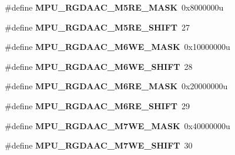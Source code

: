 \begin{DoxyCompactItemize}
\item 
\hypertarget{group___m_p_u___register___masks_ga96965e716b1fba479c7903a5ae64e305}{}\#define {\bfseries M\+P\+U\+\_\+\+R\+G\+D\+A\+A\+C\+\_\+\+M5\+R\+E\+\_\+\+M\+A\+S\+K}~0x8000000u\label{group___m_p_u___register___masks_ga96965e716b1fba479c7903a5ae64e305}

\item 
\hypertarget{group___m_p_u___register___masks_ga80db0bdec596e5f2ae168cf02b3e68d0}{}\#define {\bfseries M\+P\+U\+\_\+\+R\+G\+D\+A\+A\+C\+\_\+\+M5\+R\+E\+\_\+\+S\+H\+I\+F\+T}~27\label{group___m_p_u___register___masks_ga80db0bdec596e5f2ae168cf02b3e68d0}

\item 
\hypertarget{group___m_p_u___register___masks_ga675c429d4b18a11c7dd4d6f81e8fec4b}{}\#define {\bfseries M\+P\+U\+\_\+\+R\+G\+D\+A\+A\+C\+\_\+\+M6\+W\+E\+\_\+\+M\+A\+S\+K}~0x10000000u\label{group___m_p_u___register___masks_ga675c429d4b18a11c7dd4d6f81e8fec4b}

\item 
\hypertarget{group___m_p_u___register___masks_ga67ade60c5f10bf98e10770b8af8d2a87}{}\#define {\bfseries M\+P\+U\+\_\+\+R\+G\+D\+A\+A\+C\+\_\+\+M6\+W\+E\+\_\+\+S\+H\+I\+F\+T}~28\label{group___m_p_u___register___masks_ga67ade60c5f10bf98e10770b8af8d2a87}

\item 
\hypertarget{group___m_p_u___register___masks_ga520ccd7afefe94f2c563302f3996dbe3}{}\#define {\bfseries M\+P\+U\+\_\+\+R\+G\+D\+A\+A\+C\+\_\+\+M6\+R\+E\+\_\+\+M\+A\+S\+K}~0x20000000u\label{group___m_p_u___register___masks_ga520ccd7afefe94f2c563302f3996dbe3}

\item 
\hypertarget{group___m_p_u___register___masks_ga0166b93dc6445dac1d73289ecdb8eda1}{}\#define {\bfseries M\+P\+U\+\_\+\+R\+G\+D\+A\+A\+C\+\_\+\+M6\+R\+E\+\_\+\+S\+H\+I\+F\+T}~29\label{group___m_p_u___register___masks_ga0166b93dc6445dac1d73289ecdb8eda1}

\item 
\hypertarget{group___m_p_u___register___masks_gae26a39c4f03a041788d55172d23c277a}{}\#define {\bfseries M\+P\+U\+\_\+\+R\+G\+D\+A\+A\+C\+\_\+\+M7\+W\+E\+\_\+\+M\+A\+S\+K}~0x40000000u\label{group___m_p_u___register___masks_gae26a39c4f03a041788d55172d23c277a}

\item 
\hypertarget{group___m_p_u___register___masks_gaa8390e90127f6bfa83f10b5987ac2ec7}{}\#define {\bfseries M\+P\+U\+\_\+\+R\+G\+D\+A\+A\+C\+\_\+\+M7\+W\+E\+\_\+\+S\+H\+I\+F\+T}~30\label{group___m_p_u___register___masks_gaa8390e90127f6bfa83f10b5987ac2ec7}


\end{DoxyCompactItemize}
